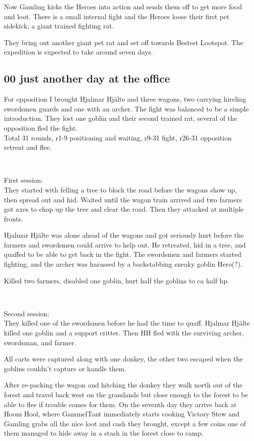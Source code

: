 Now Gamling kicks the Heroes into action and sends them off to get more food and loot. There is a small internal fight and the Heroes loose their first pet sidekick, a giant trained fighting rat. 

They bring out another giant pet rat and set off towards Bestest Lootspot. The expedition is expected to take around seven days.


\subsection*{00 just another day at the office}

For opposition I brought Hjalmar Hjälte and three wagons, two carrying hireling swordsmen guards and one with an archer.
The fight was balanced to be a simple introduction. They lost one goblin and their second trained rat, several of the opposition fled the fight.\\
Total 31 rounds, r1-9 positioning and waiting, r9-31 fight, r26-31 opposition retreat and flee.

\

First session: \\                                                       %
They started with felling a tree to block the road before the wagons show up, then spread out and hid. Waited until the wagon train arrived and two farmers got axes to chop up the tree and clear the road. Then they attacked at multiple fronts.

Hjalmar Hjälte was alone ahead of the wagons and got seriously hurt before the farmers and swordsmen could arrive to help out. He retreated, hid in a tree, and quaffed to be able to get back in the fight. The swordsmen and farmers started fighting, and the archer was harassed by a backstabbing sneaky goblin Hero(?).

Killed two farmers, disabled one goblin, hurt half the goblins to ca half hp.

\

Second session: \\                                                      %
They killed one of the swordsmen before he had the time to quaff. Hjalmar Hjälte killed one goblin and a support critter. Then HH fled with the surviving archer, swordsman, and farmer.

All carts were captured along with one donkey, the other two escaped when the goblins couldn't capture or handle them.

After re-packing the wagon and hitching the donkey they walk north out of the forest and travel back west on the grasslands but close enough to the forest to be able to flee if trouble comes for them. On the seventh day they arrive back at Hoom Hool, where GammelTant immediately starts cooking Victory Stew and Gamling grabs all the nice loot and cash they brought, except a few coins one of them managed to hide away in a stash in the forest close to camp.

